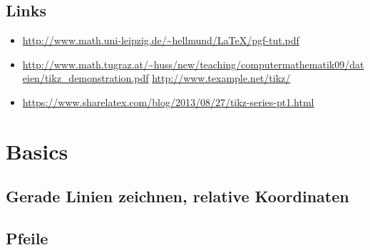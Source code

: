 \documentclass[12pt, a4paper]{scrartcl}
\begin{document}
\subsection{Links}
\begin{itemize}
   \item \url{http://www.math.uni-leipzig.de/~hellmund/LaTeX/pgf-tut.pdf}
   \item \url{http://www.math.tugraz.at/~huss/new/teaching/computermathematik09/dateien/tikz_demonstration.pdf}
   \url{http://www.texample.net/tikz/}
   \item \url{https://www.sharelatex.com/blog/2013/08/27/tikz-series-pt1.html}
\end{itemize}




\pagebreak
\section{Basics}
\subsection{Gerade Linien zeichnen, relative Koordinaten}
%
\hspace{1cm}
%



\subsection{Pfeile}
\end{document}
